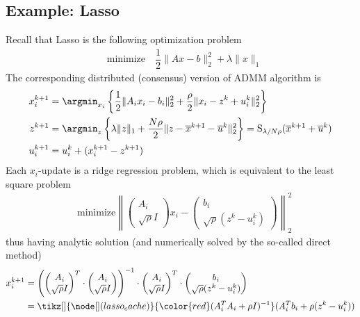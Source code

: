 \subsection{Example: Lasso}
Recall that Lasso is the following optimization problem
\begin{align*}
    & \text{minimize} \quad \dfrac{1}{2} \lVert Ax - b \rVert_2^2 + \lambda \lVert x \rVert_1
\end{align*}
The corresponding distributed (consensus) version of ADMM algorithm is
\begin{align*}
    x_i^{k+1} & = \argmin_{x_i} \left\{ \dfrac{1}{2} \lVert A_ix_i - b_i \rVert_2^2 + \dfrac{\rho}{2} \lVert x_i - z^k + u_i^k \rVert_2^2 \right\} \\
    z^{k+1} & = \argmin_z \left\{ \lambda \lVert z \rVert_1 + \dfrac{N\rho}{2} \lVert z - \overline{x}^{k+1} - \overline{u}^k \rVert_2^2 \right\} = \operatorname{S}_{\lambda/N\rho}(\overline{x}^{k+1} + \overline{u}^k) \\
    u_i^{k+1} & = u_i^k + (x_i^{k+1} - z^{k+1})
\end{align*}
Each $x_i$-update is a ridge regression problem, which is equivalent to the least square problem
\begin{align*}
    & \text{minimize} \left\lVert \begin{pmatrix} A_i \\ \sqrt{\rho}I \end{pmatrix} x_i - \begin{pmatrix} b_i \\ \sqrt{\rho}(z^k - u_i^k) \end{pmatrix} \right\rVert_2^2
\end{align*}
thus having analytic solution (and numerically solved by the so-called direct method)
\begin{align*}
x_i^{k+1} & = \left( \begin{pmatrix} A_i \\ \sqrt{\rho}I \end{pmatrix}^T \cdot \begin{pmatrix} A_i \\ \sqrt{\rho}I \end{pmatrix} \right)^{-1} \cdot \begin{pmatrix} A_i \\ \sqrt{\rho}I \end{pmatrix}^T \cdot \begin{pmatrix} b_i \\ \sqrt{\rho}(z^k - u_i^k) \end{pmatrix} \\
& = \tikz[]{\node[] (lasso_cache) {}} {\color{red} (A_i^TA_i + \rho I)^{-1} } (A_i^Tb_i + \rho (z^k - u_i^k) )
\end{align*}

